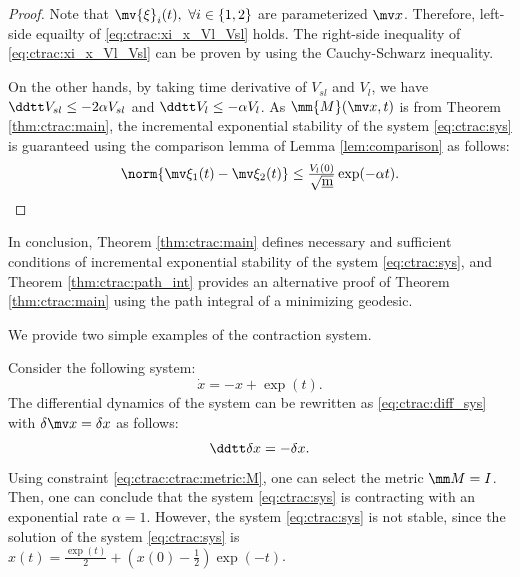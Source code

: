 \begin{proof}
    Note that $\mv{\xi}_i(t),\ \forall i\in\{1,2\}$ are parameterized $\bdx$.
    Therefore, left-side equailty of \eqref{eq:ctrac:xi_x_Vl_Vsl} holds.
    The right-side inequality of \eqref{eq:ctrac:xi_x_Vl_Vsl} can be proven by using the Cauchy-Schwarz inequality.

    On the other hands, by taking time derivative of $V_{sl}$ and $V_l$, we have $\ddtt V_{sl} \le -2\alpha V_{sl}$ and $\ddtt V_l \le -\alpha V_l$.
    As $\mm{M}(\bdx,t)$ is from Theorem \ref{thm:ctrac:main}, the incremental exponential stability of the system \eqref{eq:ctrac:sys} is guaranteed using the comparison lemma of Lemma \ref{lem:comparison} as follows: 
    \begin{equation}
        \norm{\mv\xi_1(t)-\mv\xi_2(t)}
        \le
        \tfrac{V_{l}(0)}{\sqrt{\underbar{m}}} \exp(-\alpha t)
        .
    \end{equation}
\end{proof}

In conclusion, Theorem \ref{thm:ctrac:main} defines necessary and sufficient conditions of incremental exponential stability of the system \eqref{eq:ctrac:sys}, and Theorem \ref{thm:ctrac:path_int} provides an alternative proof of Theorem \ref{thm:ctrac:main} using the path integral of a minimizing geodesic.

\hfill

We provide two simple examples of the contraction system.

\begin{example}
    Consider the following system:
    \begin{equation}
        \dot x = -x +\exp(t)
        .
    \end{equation}
    The differential dynamics of the system can be rewritten as \eqref{eq:ctrac:diff_sys} with $\delta\bdx=\delta x$ as follows:
    \begin{equation}
        \ddtt\delta x
        =
        -\delta x
        .
    \end{equation}
    Using constraint \eqref{eq:ctrac:ctrac:metric:M}, one can select the metric $\mm M=I$.
    Then, one can conclude that the system \eqref{eq:ctrac:sys} is contracting with an exponential rate $\alpha=1$.
    However, the system \eqref{eq:ctrac:sys} is not stable, since the solution of the system \eqref{eq:ctrac:sys} is $x(t) = \tfrac{\exp(t)}{2}+(x(0)-\tfrac{1}{2})\exp(-t)$.
    \label{ex:div}
\end{example}

